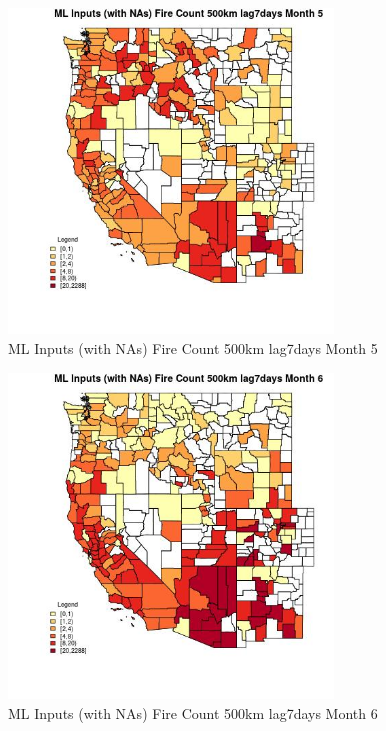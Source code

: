 \begin{figure} 
\centering  
\includegraphics[width=0.77\textwidth]{Code_Outputs/Report_ML_input_PM25_Step4_part_e_de_duplicated_aves_compiled_2019-05-20wNAs_CountyFire_Count_500km_lag7daysmedianMonth5.jpg} 
\caption{\label{fig:Report_ML_input_PM25_Step4_part_e_de_duplicated_aves_compiled_2019-05-20wNAsCountyFire_Count_500km_lag7daysmedianMonth5}ML Inputs (with NAs) Fire Count 500km lag7days Month 5} 
\end{figure} 
 

\begin{figure} 
\centering  
\includegraphics[width=0.77\textwidth]{Code_Outputs/Report_ML_input_PM25_Step4_part_e_de_duplicated_aves_compiled_2019-05-20wNAs_CountyFire_Count_500km_lag7daysmedianMonth6.jpg} 
\caption{\label{fig:Report_ML_input_PM25_Step4_part_e_de_duplicated_aves_compiled_2019-05-20wNAsCountyFire_Count_500km_lag7daysmedianMonth6}ML Inputs (with NAs) Fire Count 500km lag7days Month 6} 
\end{figure} 
 


